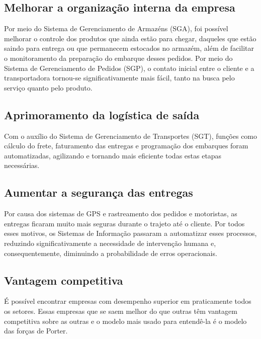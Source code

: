 \documentclass[conference]{IEEEtran}
\begin{document}
\subsection{Melhorar a organização interna da empresa}
Por meio do Sistema de Gerenciamento de Armazéns (SGA), foi possível melhorar o controle dos produtos que ainda estão para chegar, daqueles que estão saindo para entrega ou que permanecem estocados no armazém, além de facilitar o monitoramento da preparação do embarque desses pedidos. Por meio do Sistema de Gerenciamento de Pedidos (SGP), o contato inicial entre o cliente e a transportadora tornou-se significativamente mais fácil, tanto na busca pelo serviço quanto pelo produto.

\subsection{Aprimoramento da logística de saída}
Com o auxílio do Sistema de Gerenciamento de Transportes (SGT), funções como cálculo do frete, faturamento das entregas e programação dos embarques foram automatizadas, agilizando e tornando mais eficiente todas estas etapas necessárias.

\subsection{Aumentar a segurança das entregas}
Por causa dos sistemas de GPS e rastreamento dos pedidos e motoristas, as entregas ficaram muito mais seguras durante o trajeto até o cliente. Por todos esses motivos, os Sistemas de Informação passaram a automatizar esses processos, reduzindo significativamente a necessidade de intervenção humana e, consequentemente, diminuindo a probabilidade de erros operacionais.



\subsection{Vantagem competitiva}
É possível encontrar empresas com desempenho superior em praticamente todos os setores. Essas empresas que se saem melhor do que outras têm vantagem competitiva sobre as outras e o modelo mais usado para entendê-la é o modelo das forças de Porter.
\end{document}
